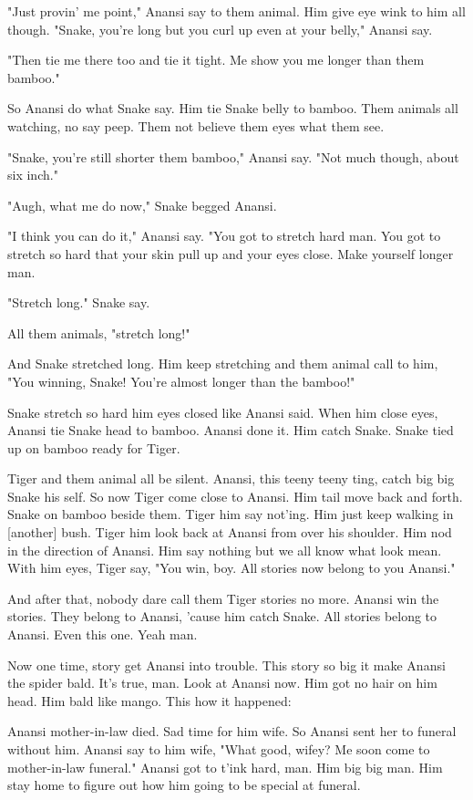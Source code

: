 "Just provin' me point," Anansi say to them animal. Him give eye wink to him all though. "Snake, you're long but you curl up even at your belly," Anansi say.

"Then tie me there too and tie it tight. Me show you me longer than them bamboo."

So Anansi do what Snake say. Him tie Snake belly to bamboo. Them animals all watching, no say peep. Them not believe them eyes what them see.

"Snake, you're still shorter them bamboo," Anansi say. "Not much though, about six inch."

"Augh, what me do now," Snake begged Anansi.

"I think you can do it," Anansi say. "You got to stretch hard man. You got to stretch so hard that your skin pull up and your eyes close. Make yourself longer man.

"Stretch long." Snake say.

All them animals, "stretch long!"

And Snake stretched long. Him keep stretching and them animal call to him, "You winning, Snake! You're almost longer than the bamboo!"

Snake stretch so hard him eyes closed like Anansi said. When him close eyes, Anansi tie Snake head to bamboo. Anansi done it. Him catch Snake. Snake tied up on bamboo ready for Tiger.

Tiger and them animal all be silent. Anansi, this teeny teeny ting, catch big big Snake his self. So now Tiger come close to Anansi. Him tail move back and forth. Snake on bamboo beside them. Tiger him say not'ing. Him just keep walking in [another] bush. Tiger him look back at Anansi from over his shoulder. Him nod in the direction of Anansi. Him say nothing but we all know what look mean. With him eyes, Tiger say, "You win, boy. All stories now belong to you Anansi."

And after that, nobody dare call them Tiger stories no more. Anansi win the stories. They belong to Anansi, 'cause him catch Snake. All stories belong to Anansi. Even this one. Yeah man.

Now one time, story get Anansi into trouble. This story so big it make Anansi the spider bald. It's true, man. Look at Anansi now. Him got no hair on him head. Him bald like mango. This how it happened:

Anansi mother-in-law died. Sad time for him wife. So Anansi sent her to funeral without him. Anansi say to him wife, "What good, wifey? Me soon come to mother-in-law funeral." Anansi got to t'ink hard, man. Him big big man. Him stay home to figure out how him going to be special at funeral.

